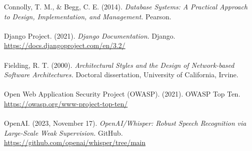 \documentclass[oneside,openany,obeyspaces]{book}
\begin{document}
\begin{flushleft}
    \hangindent=1cm Connolly, T. M., \& Begg, C. E. (2014). \textit{Database Systems: A Practical Approach to Design, Implementation, and Management.} Pearson.\\~\\

    \hangindent=1cm Django Project. (2021). \textit{Django Documentation.} Django. \url{https://docs.djangoproject.com/en/3.2/}\\~\\

    \hangindent=1cm Fielding, R. T. (2000). \textit{Architectural Styles and the Design of Network-based Software Architectures.} Doctoral dissertation, University of California, Irvine.\\~\\

    \hangindent=1cm Open Web Application Security Project (OWASP). (2021). OWASP Top Ten. \url{https://owasp.org/www-project-top-ten/}\\~\\

    \hangindent=1cm OpenAI. (2023, November 17). \textit{OpenAI/Whisper: Robust Speech Recognition via Large-Scale Weak Supervision.} GitHub. \url{https://github.com/openai/whisper/tree/main}\\~\\

\end{flushleft}
\end{document}
